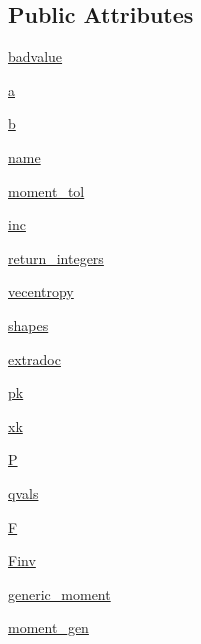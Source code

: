 \subsection*{Public Attributes}
\begin{DoxyCompactItemize}
\item 
\hyperlink{classscipy_1_1stats_1_1__distn__infrastructure_1_1rv__discrete_a45de902e7e2bdb8dbd599c86780f3e3c}{badvalue}
\item 
\hyperlink{classscipy_1_1stats_1_1__distn__infrastructure_1_1rv__discrete_a3e32a91888082de12710194969fa0512}{a}
\item 
\hyperlink{classscipy_1_1stats_1_1__distn__infrastructure_1_1rv__discrete_a7372db5b3c5949beb9e471580506a3b8}{b}
\item 
\hyperlink{classscipy_1_1stats_1_1__distn__infrastructure_1_1rv__discrete_aa62c7d74fcecaafdf770f632d991f47a}{name}
\item 
\hyperlink{classscipy_1_1stats_1_1__distn__infrastructure_1_1rv__discrete_aed2662b4f2f3d35501144c1beb2ee4b1}{moment\+\_\+tol}
\item 
\hyperlink{classscipy_1_1stats_1_1__distn__infrastructure_1_1rv__discrete_a43f1e8ce20d85ea864c5933575e7450f}{inc}
\item 
\hyperlink{classscipy_1_1stats_1_1__distn__infrastructure_1_1rv__discrete_a673904c6e52d3467fd74dc8635f109e0}{return\+\_\+integers}
\item 
\hyperlink{classscipy_1_1stats_1_1__distn__infrastructure_1_1rv__discrete_a82fecb4fc005e5f6d30e7d5239713619}{vecentropy}
\item 
\hyperlink{classscipy_1_1stats_1_1__distn__infrastructure_1_1rv__discrete_a84933f152e6689167df79166f083f65c}{shapes}
\item 
\hyperlink{classscipy_1_1stats_1_1__distn__infrastructure_1_1rv__discrete_aa5094fb3ec208d35cd0f2cd4465ba2af}{extradoc}
\item 
\hyperlink{classscipy_1_1stats_1_1__distn__infrastructure_1_1rv__discrete_ad32d0939c72a9d98dbfc106eb9ca0d65}{pk}
\item 
\hyperlink{classscipy_1_1stats_1_1__distn__infrastructure_1_1rv__discrete_ad9df613da09fbd3d27aff5690b7bb28e}{xk}
\item 
\hyperlink{classscipy_1_1stats_1_1__distn__infrastructure_1_1rv__discrete_a27e84a23b551aab7ddde6beb7d1ee129}{P}
\item 
\hyperlink{classscipy_1_1stats_1_1__distn__infrastructure_1_1rv__discrete_a89f790fae926bb507d9b89cf16594dbb}{qvals}
\item 
\hyperlink{classscipy_1_1stats_1_1__distn__infrastructure_1_1rv__discrete_a203d3dea8d844a598b92e2afc7ecab15}{F}
\item 
\hyperlink{classscipy_1_1stats_1_1__distn__infrastructure_1_1rv__discrete_a1432c7c4067d68835c1fc00269ce33d7}{Finv}
\item 
\hyperlink{classscipy_1_1stats_1_1__distn__infrastructure_1_1rv__discrete_ac905531b530c927cb8d844329d46d1fb}{generic\+\_\+moment}
\item 
\hyperlink{classscipy_1_1stats_1_1__distn__infrastructure_1_1rv__discrete_a89ec8df51278cf627167199516964e9f}{moment\+\_\+gen}
\end{DoxyCompactItemize}


